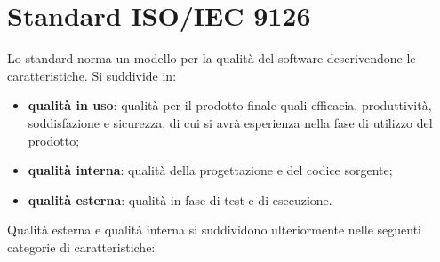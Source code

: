 \section{Standard ISO/IEC 9126}\label{app:iso9126}
Lo standard norma un modello per la qualità del software descrivendone le caratteristiche. Si suddivide in:
\begin{itemize}
	\item \textbf{qualità in uso}: qualità per il prodotto finale quali efficacia, produttività, soddisfazione e sicurezza, di cui si avrà esperienza nella fase di utilizzo del prodotto;
	\item \textbf{qualità interna}: qualità della progettazione e del codice sorgente;
	\item \textbf{qualità esterna}: qualità in fase di test e di esecuzione.
\end{itemize}
Qualità esterna e qualità interna si suddividono ulteriormente nelle seguenti categorie di caratteristiche:
